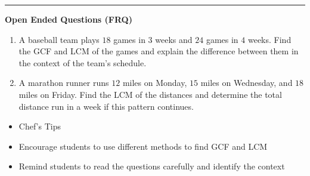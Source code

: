 \documentclass[10pt]{article}
\begin{document}
\vspace{-0.2cm}
\hrule
\vspace{0.2cm}
\textbf{\small Open Ended Questions (FRQ)}
\begin{enumerate}[label=\textbf{Q\arabic*.}, start=9, itemsep=5pt, topsep=0pt]

  \item \small A baseball team plays $18$ games in $3$ weeks and $24$ games in $4$ weeks. Find the GCF and LCM of the games and explain the difference between them in the context of the team's schedule. \vspace{2cm}

  \item \small A marathon runner runs $12$ miles on Monday, $15$ miles on Wednesday, and $18$ miles on Friday. Find the LCM of the distances and determine the total distance run in a week if this pattern continues. \vspace{2cm}

\end{enumerate}

\vfill

\begin{tcolorbox}[colback=blue!5, colframe=mainblue!50, title=\small \textbf{Chef's Tips}, fonttitle=\bfseries, bottom=1mm]
\begin{itemize}[noitemsep, topsep=2pt, leftmargin=0.5cm]
  \item \scriptsize Chef's Tips\item \scriptsize Encourage students to use different methods to find GCF and LCM\item \scriptsize Remind students to read the questions carefully and identify the context
\end{itemize}
\end{tcolorbox}
\end{document}
